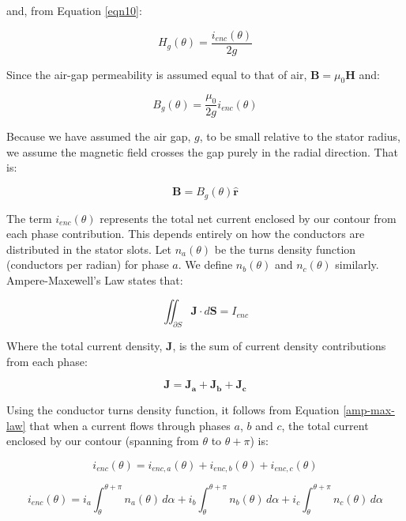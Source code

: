 \documentclass{article}
\begin{document}
and, from Equation \ref{eqn10}:

\begin{equation}
    H_g(\theta) = \frac{i_{enc}(\theta)}{2g}
\end{equation}

Since the air-gap permeability is assumed equal to that of air, $\mathbf{B} = \mu_0\mathbf{H}$ and:

\begin{equation}
\label{eqn12}
    B_g(\theta) = \frac{\mu_0}{2g}i_{enc}(\theta)
\end{equation}

Because we have assumed the air gap, $g$, to be small relative to the stator radius, we assume the magnetic field crosses the gap purely in the radial direction. That is:

\begin{equation}
    \mathbf{B} = B_g(\theta)\mathbf{\hat{r}}
\end{equation}

The term $i_{enc}(\theta)$ represents the total net current enclosed by our contour from each phase contribution. This depends entirely on how the conductors are distributed in the stator slots. Let $n_a(\theta)$ be the turns density function (conductors per radian) for phase $a$. We define $n_b(\theta)$ and $n_c(\theta)$ similarly. Ampere-Maxewell's Law states that:

\begin{equation}
\label{amp-max-law}
    \iint_{\partial S} \mathbf{J} \cdot d\mathbf{S} = I_{enc}
\end{equation}

Where the total current density, $\mathbf{J}$, is the sum of current density contributions from each phase:

\begin{equation}
    \mathbf{J} = \mathbf{J_a} + \mathbf{J_b} + \mathbf{J_c}
\end{equation}

Using the conductor turns density function, it follows from Equation \ref{amp-max-law} that when a current flows through phases $a$, $b$ and $c$, the total current enclosed by our contour (spanning from $\theta$ to $\theta + \pi$) is:

\begin{equation}
    i_{enc}(\theta) = i_{enc,a}(\theta) + i_{enc,b}(\theta) + i_{enc,c}(\theta)
\end{equation}

\begin{equation}
    i_{enc}(\theta) = i_a\int_{\theta}^{\theta + \pi}{n_a(\theta) \, d\alpha} + i_b\int_{\theta}^{\theta + \pi}{n_b(\theta) \, d\alpha} + i_c\int_{\theta}^{\theta + \pi}{n_c(\theta) \, d\alpha}
\end{equation}
\end{document}

